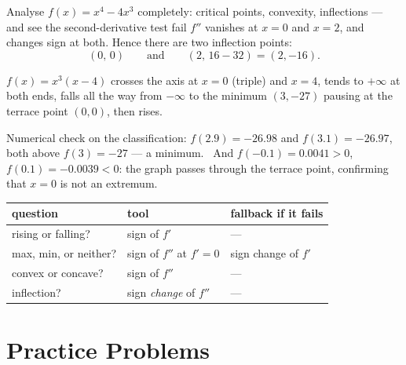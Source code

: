 \begin{worked}{Analyse $f(x)=x^{4}-4x^{3}$ completely: critical points, convexity, inflections --- and see the second-derivative test fail}
$f''$ vanishes at $x=0$ and $x=2$, and changes sign at both. Hence there are
two inflection points:
\[
  (0,\,0)\qquad\text{and}\qquad (2,\,16-32)=(2,-16).
\]

$f(x)=x^{3}(x-4)$ crosses the axis at $x=0$ (triple) and $x=4$, tends to
$+\infty$ at both ends, falls all the way from $-\infty$ to the minimum
$(3,-27)$ pausing at the terrace point $(0,0)$, then rises.
\begin{center}
\end{center}
Numerical check on the classification: $f(2.9)=-26.98$ and $f(3.1)=-26.97$,
both above $f(3)=-27$ --- a minimum. \checkmark\ And $f(-0.1)=0.0041>0$,
$f(0.1)=-0.0039<0$: the graph passes through the terrace point, confirming
that $x=0$ is not an extremum.

\begin{center}\footnotesize
\begin{tabular}{lll}
  \hline
  question & tool & fallback if it fails\\
  \hline
  rising or falling? & sign of $f'$ & ---\\
  max, min, or neither? & sign of $f''$ at $f'=0$ & sign change of $f'$\\
  convex or concave? & sign of $f''$ & ---\\
  inflection? & sign \emph{change} of $f''$ & ---\\
  \hline
\end{tabular}
\end{center}
\end{worked}

\section{Practice Problems}

